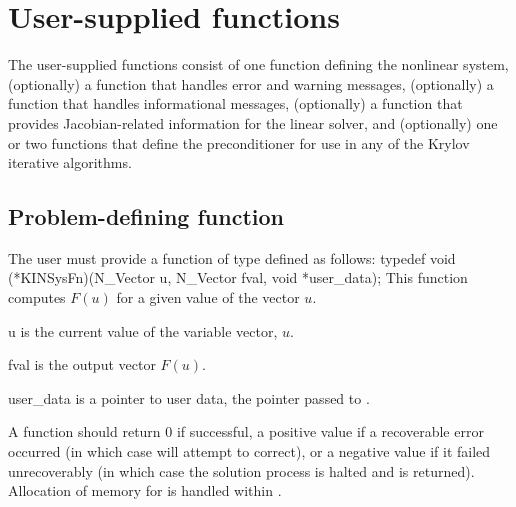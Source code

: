 \section{User-supplied functions}\label{ss:user_fct_sol}

The user-supplied functions consist of one function defining the nonlinear system,
(optionally) a function that handles error and warning messages,
(optionally) a function that handles informational messages, 
(optionally) a function that provides Jacobian-related information for the linear
solver, and (optionally) one or two functions that define the preconditioner for 
use in any of the Krylov iterative algorithms.

\subsection{Problem-defining function}\label{ss:sysFn}

The user must provide a function of type  defined as follows:
{
  typedef void (*KINSysFn)(N\_Vector u, N\_Vector fval, void *user\_data);
}
{
  This function computes $F(u)$ for a given value of the vector $u$.
}
{
  \begin{args}
  \item[u]
    is the current value of the variable vector, $u$.
  \item[fval]
    is the output vector $F(u)$.
  \item[user\_data]
    is a pointer to user data, the pointer       
    passed to .   
  \end{args}
}
{
  A  function should return $0$ if successful, a positive value
  if a recoverable error occurred (in which case {\kinsol} will attempt to
  correct), or a negative value if it failed unrecoverably (in which case
  the solution process is halted and  is returned).
}
{
  Allocation of memory for  is handled within {\kinsol}.
}

